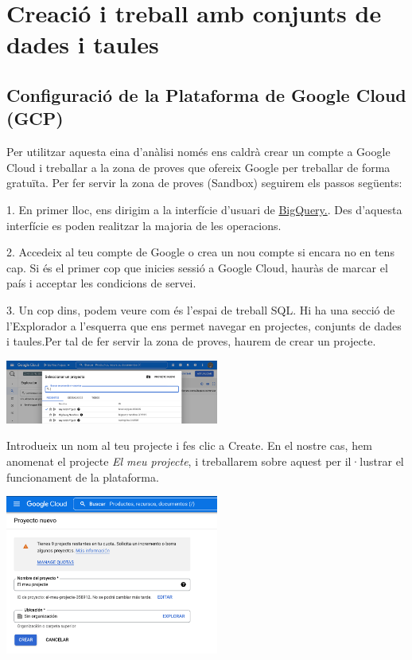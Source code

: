 \documentclass[12pt,longbibliography]{article}
\theoremstyle{definition}
\theoremstyle{remark}
\begin{document}
\pagebreak

\section{Creació i treball amb conjunts de dades i taules}

\subsection{Configuració de la Plataforma de Google Cloud (GCP)}

\graphicspath{ {BigQuery/Imatges tutorial/} }

Per utilitzar aquesta eina d’anàlisi només ens caldrà crear un compte a Google Cloud i treballar a la zona de proves que ofereix Google per treballar de forma gratuïta.
Per fer servir la zona de proves (Sandbox) seguirem els passos següents: 

1. En primer lloc, ens dirigim a la interfície d’usuari de \href{https://console.cloud.google.com}{BigQuery.}. Des d'aquesta interfície es poden realitzar la majoria de les operacions.

2. Accedeix al teu compte de Google o crea un nou compte si encara no en tens cap. Si és el primer cop que inicies sessió a Google Cloud, hauràs de marcar el país i acceptar les condicions de servei.

3. Un cop dins, podem veure com és l'espai de treball SQL. Hi ha una secció de l'Explorador a l'esquerra que ens permet navegar en projectes, conjunts de dades i taules.Per tal de fer servir la zona de proves, haurem de crear un projecte.

\begin{center}
\includegraphics[width=7cm]{bq1}
\end{center}

Introdueix un nom al teu projecte i fes clic a Create. En el nostre cas, hem anomenat el projecte \textit{El meu projecte}, i treballarem sobre aquest per il·lustrar el funcionament de la plataforma.

\begin{center}
\includegraphics[width=7cm]{bq2}
\end{center}
\end{document}
